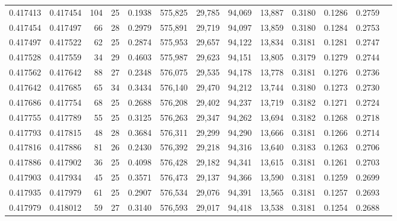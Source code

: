 \begin{tabular}{rrrrrrrrrrrrr}
0.417413 & 0.417454 &   104 &  25 &                                     0.1938 & 575,825 &  29,785 &  94,069 &  13,887 & 0.3180 & 0.1286 & 0.2759 \\
0.417454 & 0.417497 &    66 &  28 &                                     0.2979 & 575,891 &  29,719 &  94,097 &  13,859 & 0.3180 & 0.1284 & 0.2753 \\
0.417497 & 0.417522 &    62 &  25 &                                     0.2874 & 575,953 &  29,657 &  94,122 &  13,834 & 0.3181 & 0.1281 & 0.2747 \\
0.417528 & 0.417559 &    34 &  29 &                                     0.4603 & 575,987 &  29,623 &  94,151 &  13,805 & 0.3179 & 0.1279 & 0.2744 \\
0.417562 & 0.417642 &    88 &  27 &                                     0.2348 & 576,075 &  29,535 &  94,178 &  13,778 & 0.3181 & 0.1276 & 0.2736 \\
0.417642 & 0.417685 &    65 &  34 &                                     0.3434 & 576,140 &  29,470 &  94,212 &  13,744 & 0.3180 & 0.1273 & 0.2730 \\
0.417686 & 0.417754 &    68 &  25 &                                     0.2688 & 576,208 &  29,402 &  94,237 &  13,719 & 0.3182 & 0.1271 & 0.2724 \\
0.417755 & 0.417789 &    55 &  25 &                                     0.3125 & 576,263 &  29,347 &  94,262 &  13,694 & 0.3182 & 0.1268 & 0.2718 \\
0.417793 & 0.417815 &    48 &  28 &                                     0.3684 & 576,311 &  29,299 &  94,290 &  13,666 & 0.3181 & 0.1266 & 0.2714 \\
0.417816 & 0.417886 &    81 &  26 &                                     0.2430 & 576,392 &  29,218 &  94,316 &  13,640 & 0.3183 & 0.1263 & 0.2706 \\
0.417886 & 0.417902 &    36 &  25 &                                     0.4098 & 576,428 &  29,182 &  94,341 &  13,615 & 0.3181 & 0.1261 & 0.2703 \\
0.417903 & 0.417934 &    45 &  25 &                                     0.3571 & 576,473 &  29,137 &  94,366 &  13,590 & 0.3181 & 0.1259 & 0.2699 \\
0.417935 & 0.417979 &    61 &  25 &                                     0.2907 & 576,534 &  29,076 &  94,391 &  13,565 & 0.3181 & 0.1257 & 0.2693 \\
0.417979 & 0.418012 &    59 &  27 &                                     0.3140 & 576,593 &  29,017 &  94,418 &  13,538 & 0.3181 & 0.1254 & 0.2688 \\

\end{tabular}
